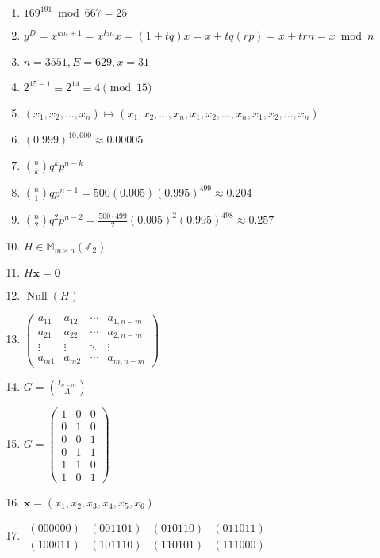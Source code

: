 \documentclass[oneside,10pt,]{article}
\newcommand{\Null}{\operatorname{Null}}
\begin{document}
\begin{enumerate}
\item{}\(\displaystyle 169^{191} \bmod 667 = 25\)%
\item{}\(\displaystyle y^D = x^{km + 1} = x^{km} x = (1 + tq) x = x + tq(rp) = x + trn = x \bmod n\)%
\item{}\(\displaystyle n = 3551, E = 629, x = 31\)%
\item{}\(\displaystyle 2^{15-1} \equiv 2^{14} \equiv 4 \pmod{15}\)%
\item{}\(\displaystyle (x_{1}, x_{2}, \ldots, x_{n}) \mapsto (x_{1}, x_{2}, \ldots, x_{n}, x_{1}, x_{2}, \ldots, x_{n}, x_{1}, x_{2}, \ldots, x_{n})\)%
\item{}\(\displaystyle (0.999)^{10,000} \approx 0.00005\)%
\item{}\(\displaystyle \binom{n}{k} q^kp^{n - k}\)%
\item{}\(\displaystyle \binom{n}{1} qp^{n - 1}= 500(0.005)(0.995)^{499} \approx 0.204\)%
\item{}\(\displaystyle \binom{n}{2} q^{2}p^{n - 2}= \frac{500 \cdot 499}{2}(0.005)^{2}(0.995)^{498} \approx 0.257\)%
\item{}\(\displaystyle H \in {\mathbb M}_{m \times n}({\mathbb Z}_2)\)%
\item{}\(\displaystyle H{\mathbf x} = {\mathbf 0}\)%
\item{}\(\displaystyle \Null(H)\)%
\item{}\(\displaystyle \begin{pmatrix} a_{11} & a_{12} & \cdots & a_{1,n-m} \\ a_{21} & a_{22} & \cdots & a_{2,n-m} \\ \vdots & \vdots & \ddots & \vdots \\ a_{m1} & a_{m2} & \cdots & a_{m,n-m} \end{pmatrix}\)%
\item{}\(\displaystyle G = \left( \frac{I_{n-m}}{A} \right)\)%
\item{}\(\displaystyle G= \begin{pmatrix} 1 & 0 & 0 \\ 0 & 1 & 0 \\ 0 & 0 & 1 \\ 0 & 1 & 1 \\ 1 & 1 & 0 \\ 1 & 0 & 1 \end{pmatrix}\)%
\item{}\(\displaystyle {\mathbf x} = (x_1, x_2, x_3, x_4, x_5, x_6)\)%
\item{}\(\displaystyle \begin{array}{cccc} (000000) & (001101) & (010110) & (011011) \\ (100011) & (101110) & (110101) & (111000). \end{array}\)%

\end{enumerate}
\end{document}
